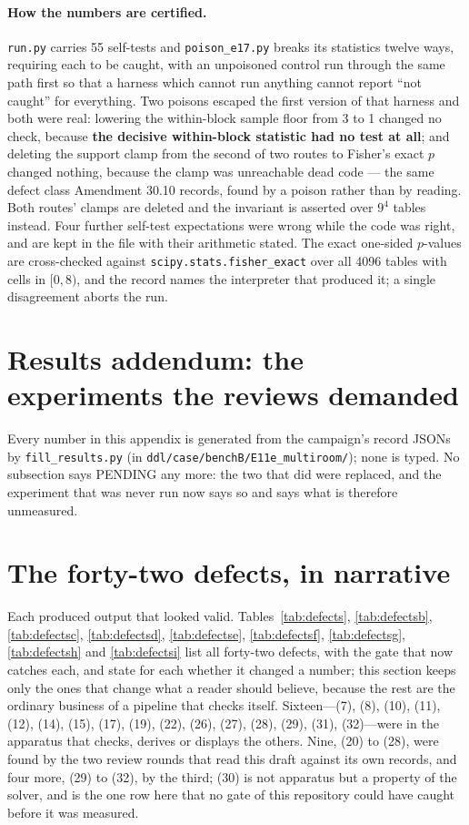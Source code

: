 \documentclass{article}
\begin{document}
\paragraph{How the numbers are certified.}
\texttt{run.py} carries 55 self-tests and \texttt{poison\_e17.py} breaks its
statistics twelve ways, requiring each to be caught, with an unpoisoned control run
through the same path first so that a harness which cannot run anything cannot
report ``not caught'' for everything.  Two poisons escaped the first version of that
harness and both were real: lowering the within-block sample floor from 3 to 1
changed no check, because \textbf{the decisive within-block statistic had no test at
all}; and deleting the support clamp from the second of two routes to Fisher's exact
$p$ changed nothing, because the clamp was unreachable dead code --- the same defect
class Amendment 30.10 records, found by a poison rather than by reading.  Both
routes' clamps are deleted and the invariant is asserted over $9^4$ tables instead.
Four further self-test expectations were wrong while the code was right, and are kept
in the file with their arithmetic stated.  The exact one-sided $p$-values are
cross-checked against \texttt{scipy.stats.fisher\_exact} over all 4096 tables with
cells in $[0,8)$, and the record names the interpreter that produced it; a single
disagreement aborts the run.

\section{Results addendum: the experiments the reviews demanded}
\label{app:results}
Every number in this appendix is generated from the campaign's record
JSONs by \texttt{fill\_results.py} (in \texttt{ddl/case/benchB/E11e\_multiroom/}); none is
typed.  No subsection says PENDING any more: the two that did were replaced, and the
experiment that was never run now says so and says what is therefore unmeasured.
{\sloppy\par}

\section{The forty-two defects, in narrative}
\label{app:lessons}
Each produced output that looked valid.  Tables~\ref{tab:defects}, \ref{tab:defectsb}, \ref{tab:defectsc}, \ref{tab:defectsd}, \ref{tab:defectse}, \ref{tab:defectsf}, \ref{tab:defectsg},
\ref{tab:defectsh} and \ref{tab:defectsi} list all forty-two defects,
with the gate that now catches each, and state for each whether it changed a number; this
section keeps only the ones that change what a reader should believe, because the rest
are the ordinary business of a pipeline that checks itself.  Sixteen---(7), (8), (10),
(11), (12), (14), (15), (17), (19), (22), (26), (27), (28), (29), (31), (32)---were in the
apparatus that checks, derives or displays the others.  Nine, (20) to (28), were found by
the two review rounds that read this draft against its own records, and four more, (29) to
(32), by the third; (30) is not apparatus but a property of the solver, and is the one row
here that no gate of this repository could have caught before it was measured.
\end{document}
